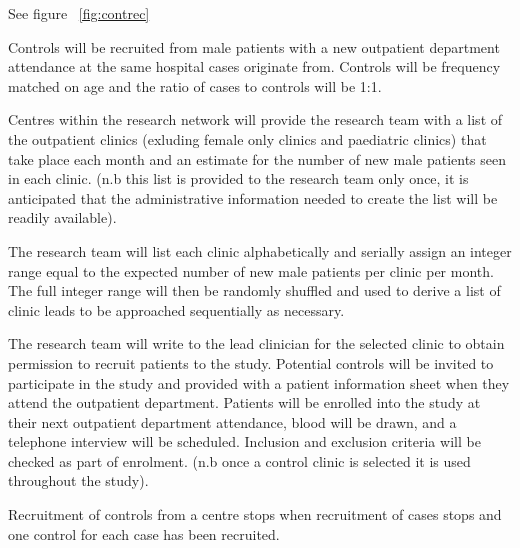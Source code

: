 \documentclass[a4paper,10pt]{article}
\begin{document}
See figure ~\ref{fig:contrec}

Controls will be recruited from male patients with a new outpatient department attendance at the same hospital cases originate from. Controls will be frequency matched on age and the ratio of cases to controls will be 1:1.  

 Centres within the research network will provide the research team with a list of the outpatient clinics (exluding female only clinics and paediatric clinics) that take place each month and an estimate for the number of new male patients seen in each clinic. (n.b this list is provided to the research team only once, it is anticipated that the administrative information needed to create the list will be readily available). 

 The research team will list each clinic alphabetically and serially assign an integer range equal to the expected number of new male patients per clinic per month. The full integer range will then be randomly shuffled and used to derive a list of clinic leads to be approached sequentially as necessary.

The research team will write to the lead clinician for the selected clinic to obtain permission to recruit patients to the study. Potential controls will be invited to participate in the study and provided with a patient information sheet when they attend the outpatient department. Patients will be enrolled into the study at their next outpatient department attendance, blood will be drawn, and a telephone interview will be scheduled. Inclusion and exclusion criteria will be checked as
part of enrolment. (n.b once a control clinic is selected it is used throughout the study).

Recruitment of controls from a centre stops when recruitment of cases stops and one control for each case has been recruited.
\end{document}
